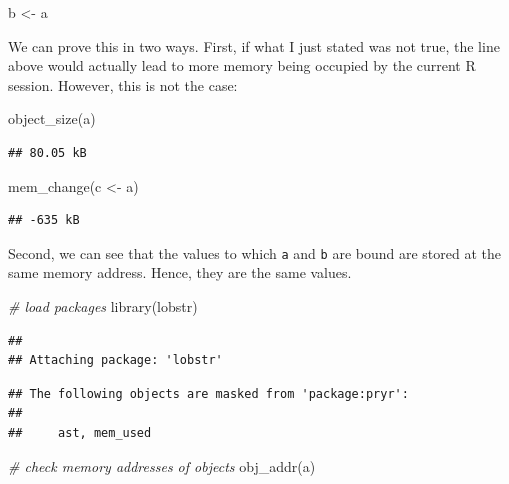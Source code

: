 \documentclass[
  12pt,
]{style/krantz}
\newenvironment{Shaded}{\begin{snugshade}}{\end{snugshade}}
\newcommand{\CommentTok}[1]{\textcolor[rgb]{0.56,0.35,0.01}{\textit{#1}}}
\newcommand{\FunctionTok}[1]{\textcolor[rgb]{0.00,0.00,0.00}{#1}}
\newcommand{\NormalTok}[1]{#1}
\newcommand{\OtherTok}[1]{\textcolor[rgb]{0.56,0.35,0.01}{#1}}
\begin{document}
\begin{Shaded}
\begin{Highlighting}[]
\NormalTok{b }\OtherTok{\textless{}{-}}\NormalTok{ a}
\end{Highlighting}
\end{Shaded}

We can prove this in two ways. First, if what I just stated was not true, the line above would actually lead to more memory being occupied by the current R session. However, this is not the case:

\begin{Shaded}
\begin{Highlighting}[]
\FunctionTok{object\_size}\NormalTok{(a)}
\end{Highlighting}
\end{Shaded}

\begin{verbatim}
## 80.05 kB
\end{verbatim}

\begin{Shaded}
\begin{Highlighting}[]
\FunctionTok{mem\_change}\NormalTok{(c }\OtherTok{\textless{}{-}}\NormalTok{ a)}
\end{Highlighting}
\end{Shaded}

\begin{verbatim}
## -635 kB
\end{verbatim}

Second, we can see that the values to which \texttt{a} and \texttt{b} are bound are stored at the same memory address. Hence, they are the same values.

\begin{Shaded}
\begin{Highlighting}[]
\CommentTok{\# load packages}
\FunctionTok{library}\NormalTok{(lobstr)}
\end{Highlighting}
\end{Shaded}

\begin{verbatim}
## 
## Attaching package: 'lobstr'
\end{verbatim}

\begin{verbatim}
## The following objects are masked from 'package:pryr':
## 
##     ast, mem_used
\end{verbatim}

\begin{Shaded}
\begin{Highlighting}[]
\CommentTok{\# check memory addresses of objects}
\FunctionTok{obj\_addr}\NormalTok{(a)}
\end{Highlighting}
\end{Shaded}
\end{document}
